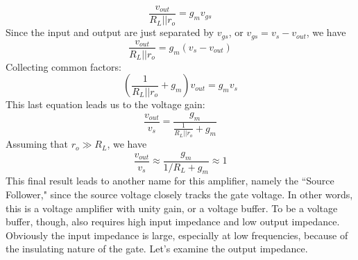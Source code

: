     \begin{equation}
        \frac{{{v_{out}}}}{{{R_L}||{r_o}}} = {g_m}{v_{gs}}
    \end{equation}
Since the input and output are just separated by $v_{gs}$, or $v_{gs} = v_{s} - v_{out}$, we have
    \begin{equation}
        \frac{{{v_{out}}}}{{{R_L}||{r_o}}} = {g_m}\left( {{v_{s}} - {v_{out}}} \right)
    \end{equation}
Collecting common factors:
    \begin{equation}
        \left( {\frac{1}{{{R_L}||{r_o}}} + {g_m}} \right){v_{out}} = {g_m}{v_{s}}
    \end{equation}
This last equation leads us to the voltage gain:
    \begin{equation}
        \frac{{{v_{out}}}}{{{v_{s}}}} = \frac{{{g_m}}}{{\frac{1}{{{R_L}||{r_o}}} + {g_m}}}
    \end{equation}
Assuming that $r_o \gg R_L$, we have
    \begin{equation}
        \frac{{{v_{out}}}}{{{v_{s}}}} \approx \frac{{{g_m}}}{{1/{R_L} + {g_m}}} \approx 1
    \end{equation}
This final result leads to another name for this amplifier, namely the ``Source Follower," since the source voltage closely tracks the gate voltage.  In other words, this is a voltage amplifier with unity gain, or a voltage buffer.
To be a voltage buffer, though, also requires high input impedance and low output impedance.  Obviously the input impedance is large, especially at low frequencies, because of the insulating nature of the gate.  Let's examine the output impedance.
